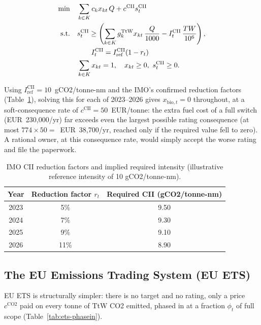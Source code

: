 \begin{align}
  \min \quad & \sum_{k\in K}c_kx_{kt}\,Q + c^{\text{CII}}s_t^{\text{CII}} \notag\\
  \text{s.t.} \quad & s_t^{\text{CII}} \geq \left(\sum_{k\in K}g_k^{\text{TtW}}x_{kt}\,\frac{Q}{1000} - I^{\text{CII}}_t\,\frac{TW}{10^6}\right), \notag\\
  & \qquad I^{\text{CII}}_t = I^{\text{CII}}_{\text{ref}}(1-r_t) \notag\\
  & \sum_{k\in K}x_{kt}=1, \quad x_{kt}\geq0,\ s_t^{\text{CII}}\geq0. \notag
\end{align}

Using $I^{\text{CII}}_{\text{ref}}=10$~gCO2/tonne-nm and the IMO's
confirmed reduction factors (Table~\ref{tab:cii-factors}), solving this
for each of 2023--2026 gives $x_{\text{bio},t}=0$ throughout, at a
soft-consequence rate of $c^{\text{CII}}=50$~EUR/tonne: the extra fuel
cost of a full switch (EUR~230{,}000/yr) far exceeds even the largest
possible rating consequence (at most
$774\times50=$~EUR~38{,}700/yr, reached only if the required value fell
to zero). A rational owner, at this consequence rate, would simply
accept the worse rating and file the paperwork.

\begin{table}[htbp]
\centering
\caption{IMO CII reduction factors and implied required intensity (illustrative reference intensity of 10 gCO2/tonne-nm).}
\label{tab:cii-factors}
\begin{tabular}{@{}ccc@{}}
\toprule
Year & Reduction factor $r_t$ & Required CII (gCO2/tonne-nm) \\
\midrule
2023 & 5\% & 9.50 \\
2024 & 7\% & 9.30 \\
2025 & 9\% & 9.10 \\
2026 & 11\% & 8.90 \\
\bottomrule
\end{tabular}
\end{table}

\subsection{The EU Emissions Trading System (EU ETS)}
\label{sec:regimes-ets}

EU ETS is structurally simpler: there is no target and no rating, only a
price $c^{\text{CO2}}$ paid on every tonne of TtW CO2 emitted, phased in
at a fraction $\phi_t$ of full scope (Table~\ref{tab:ets-phasein}).

